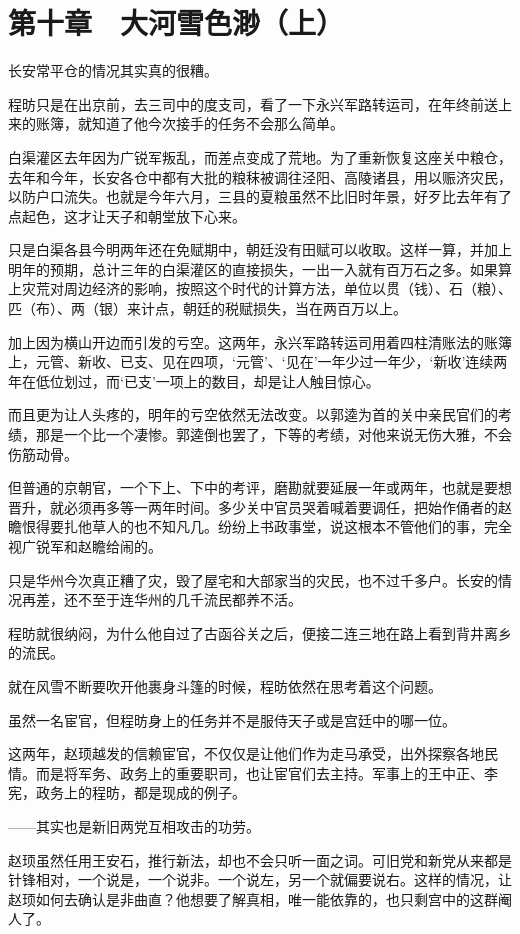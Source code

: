 \section{第十章　大河雪色渺（上）}

长安常平仓的情况其实真的很糟。

程昉只是在出京前，去三司中的度支司，看了一下永兴军路转运司，在年终前送上来的账簿，就知道了他今次接手的任务不会那么简单。

白渠灌区去年因为广锐军叛乱，而差点变成了荒地。为了重新恢复这座关中粮仓，去年和今年，长安各仓中都有大批的粮秣被调往泾阳、高陵诸县，用以赈济灾民，以防户口流失。也就是今年六月，三县的夏粮虽然不比旧时年景，好歹比去年有了点起色，这才让天子和朝堂放下心来。

只是白渠各县今明两年还在免赋期中，朝廷没有田赋可以收取。这样一算，并加上明年的预期，总计三年的白渠灌区的直接损失，一出一入就有百万石之多。如果算上灾荒对周边经济的影响，按照这个时代的计算方法，单位以贯（钱）、石（粮）、匹（布）、两（银）来计点，朝廷的税赋损失，当在两百万以上。

加上因为横山开边而引发的亏空。这两年，永兴军路转运司用着四柱清账法的账簿上，元管、新收、已支、见在四项，‘元管’、‘见在’一年少过一年少，‘新收’连续两年在低位划过，而‘已支’一项上的数目，却是让人触目惊心。

而且更为让人头疼的，明年的亏空依然无法改变。以郭逵为首的关中亲民官们的考绩，那是一个比一个凄惨。郭逵倒也罢了，下等的考绩，对他来说无伤大雅，不会伤筋动骨。

但普通的京朝官，一个下上、下中的考评，磨勘就要延展一年或两年，也就是要想晋升，就必须再多等一两年时间。多少关中官员哭着喊着要调任，把始作俑者的赵瞻恨得要扎他草人的也不知凡几。纷纷上书政事堂，说这根本不管他们的事，完全视广锐军和赵瞻给闹的。

只是华州今次真正糟了灾，毁了屋宅和大部家当的灾民，也不过千多户。长安的情况再差，还不至于连华州的几千流民都养不活。

程昉就很纳闷，为什么他自过了古函谷关之后，便接二连三地在路上看到背井离乡的流民。

就在风雪不断要吹开他裹身斗篷的时候，程昉依然在思考着这个问题。

虽然一名宦官，但程昉身上的任务并不是服侍天子或是宫廷中的哪一位。

这两年，赵顼越发的信赖宦官，不仅仅是让他们作为走马承受，出外探察各地民情。而是将军务、政务上的重要职司，也让宦官们去主持。军事上的王中正、李宪，政务上的程昉，都是现成的例子。

——其实也是新旧两党互相攻击的功劳。

赵顼虽然任用王安石，推行新法，却也不会只听一面之词。可旧党和新党从来都是针锋相对，一个说是，一个说非。一个说左，另一个就偏要说右。这样的情况，让赵顼如何去确认是非曲直？他想要了解真相，唯一能依靠的，也只剩宫中的这群阉人了。

